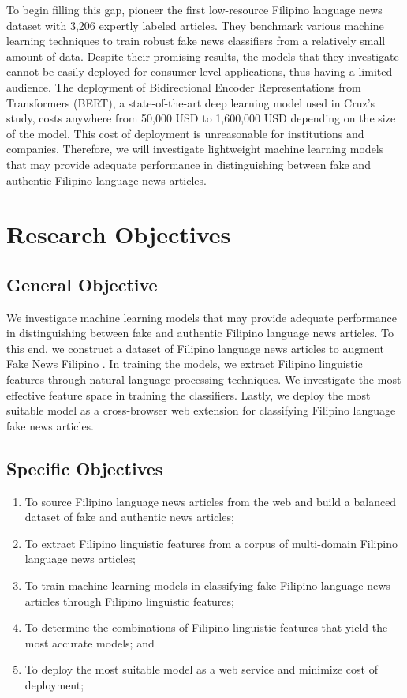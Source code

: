 To begin filling this gap,  pioneer the first low-resource Filipino language news dataset with 3,206 expertly labeled articles. They benchmark various machine learning techniques to train robust fake news classifiers from a relatively small amount of data. Despite their promising results, the models that they investigate cannot be easily deployed for consumer-level applications, thus having a limited audience. The deployment of Bidirectional Encoder Representations from Transformers (BERT), a state-of-the-art deep learning model used in Cruz's study, costs anywhere from 50,000 USD to 1,600,000 USD \cite{paleyes-2022} depending on the size of the model. This cost of deployment is unreasonable for institutions and companies. Therefore, we will investigate lightweight machine learning models that may provide adequate performance in distinguishing between fake and authentic Filipino language news articles.

\section{Research Objectives}
\label{sec:researchobjectives}

\subsection{General Objective}
\label{sec:generalobjective}

We investigate machine learning models that may provide adequate performance in distinguishing between fake and authentic Filipino language news articles. To this end, we construct a dataset of Filipino language news articles to augment Fake News Filipino \cite{fake-news-filipino}. In training the models, we extract Filipino linguistic features \cite{imperial-2020, imperial-2021} through natural language processing techniques. We investigate the most effective feature space in training the classifiers. Lastly, we deploy the most suitable model as a cross-browser web extension for classifying Filipino language fake news articles.

\subsection{Specific Objectives}
\label{sec:specificobjectives}

\begin{enumerate}
   \item To source Filipino language news articles from the web and build a balanced dataset of fake and authentic news articles;
   \item To extract Filipino linguistic features from a corpus of multi-domain Filipino language news articles;
   \item To train machine learning models in classifying fake Filipino language news articles through Filipino linguistic features;
   \item To determine the combinations of Filipino linguistic features that yield the most accurate models; and
   \item To deploy the most suitable model as a web service and minimize cost of deployment;
\end{enumerate}

